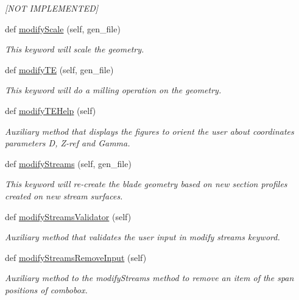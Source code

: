 \begin{DoxyCompactItemize}
\begin{DoxyCompactList}\small\item\em \mbox{[}N\+OT I\+M\+P\+L\+E\+M\+E\+N\+T\+ED\mbox{]} \end{DoxyCompactList}\item 
def \hyperlink{a00070_aa1bef88b3d57a567e44548155e7ec02f}{modify\+Scale} (self, gen\+\_\+file)
\begin{DoxyCompactList}\small\item\em This keyword will scale the geometry. \end{DoxyCompactList}\item 
def \hyperlink{a00070_a52d4edd27f78b5559e6e3683c6adb3bc}{modify\+TE} (self, gen\+\_\+file)
\begin{DoxyCompactList}\small\item\em This keyword will do a milling operation on the geometry. \end{DoxyCompactList}\item 
def \hyperlink{a00070_a0894116159595156b62859c796bdea1d}{modify\+T\+E\+Help} (self)
\begin{DoxyCompactList}\small\item\em Auxiliary method that displays the figures to orient the user about coordinates parameters D, Z-\/ref and Gamma. \end{DoxyCompactList}\item 
def \hyperlink{a00070_a66f6209a0c4caa0ba5e25b5fd913eff5}{modify\+Streams} (self, gen\+\_\+file)
\begin{DoxyCompactList}\small\item\em This keyword will re-\/create the blade geometry based on new section profiles created on new stream surfaces. \end{DoxyCompactList}\item 
def \hyperlink{a00070_af60dda179dc289691a59b52cb8ed3e70}{modify\+Streams\+Validator} (self)
\begin{DoxyCompactList}\small\item\em Auxiliary method that validates the user input in modify streams keyword. \end{DoxyCompactList}\item 
def \hyperlink{a00070_ade4195a752861e46586e7b163136620f}{modify\+Streams\+Remove\+Input} (self)
\begin{DoxyCompactList}\small\item\em Auxiliary method to the modify\+Streams method to remove an item of the span positions of combobox. \end{DoxyCompactList}\item 

\end{DoxyCompactItemize}
